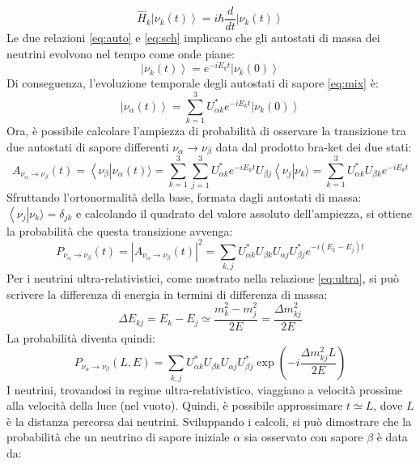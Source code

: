 \begin{equation}
    \hat{H}_k\left|\nu_k(t)\right\rangle=i\hbar\frac{d}{dt}\left|\nu_k(t)\right\rangle
    \label{eq:sch}
\end{equation}
Le due relazioni \ref{eq:auto} e \ref{eq:sch} implicano che gli autostati di massa dei neutrini evolvono nel tempo come onde piane:
\begin{equation}
    \left|\nu_k(t)\right\rangle=e^{-iE_kt}\left|\nu_k(0)\right\rangle
\end{equation}
Di conseguenza, l'evoluzione temporale  degli autostati di sapore \ref{eq:mix} è:
\begin{equation}
     \left|\nu_\alpha(t)\right\rangle=\sum_{k=1}^3U^*_{\alpha k}e^{-iE_kt}\left|\nu_k(0)\right\rangle
\end{equation}
Ora, è possibile calcolare l'ampiezza di probabilità di osservare la transizione tra due autostati di sapore differenti $\nu_\alpha\to\nu_\beta$ data dal prodotto bra-ket dei due stati:
\begin{equation}
    A_{\nu_\alpha\to\nu_\beta}(t)=\left\langle\nu_\beta\right|\nu_\alpha(t)\rangle=\sum_{k=1}^{3}\sum_{j=1}^3U_{\alpha k}^*e^{-iE_kt}U_{\beta j}\left\langle\nu_j\right|\nu_k\rangle=\sum_{k=1}^3U_{\alpha k}^*U_{\beta k}e^{-iE_kt}
\end{equation}
Sfruttando l'ortonormalità della base, formata dagli autostati di massa: $\left\langle\nu_j\right|\nu_k\rangle=\delta_{jk}$ e calcolando il quadrato del valore assoluto dell'ampiezza, si ottiene la probabilità che questa transizione avvenga:
\begin{equation}
    P_{\nu_\alpha\to\nu_\beta}(t)=\left|A_{\nu_\alpha\to\nu_\beta}(t)\right|^2=\sum_{k,j}U_{\alpha k}^*U_{\beta k}U_{\alpha j}U_{\beta j}^*e^{-i(E_k-E_j)t}
\end{equation}
Per i neutrini ultra-relativistici, come mostrato nella relazione \ref{eq:ultra}, si può scrivere la differenza di energia in termini di differenza di massa:
\begin{equation}
    \Delta E_{kj}=E_k-E_j\simeq\frac{m^2_k-m^2_j}{2E}=\frac{\Delta m^2_{kj}}{2E}
\end{equation}
La probabilità diventa quindi:
\begin{equation}
     P_{\nu_\alpha\to\nu_\beta}(L, E)=\sum_{k,j}U_{\alpha k}^*U_{\beta k}U_{\alpha j}U_{\beta j}^*\exp{\left(-i\frac{\Delta m_{kj}^2L}{2E}\right)}
\end{equation}
I neutrini, trovandosi in regime ultra-relativistico, viaggiano a velocità prossime alla velocità della luce (nel vuoto). Quindi, è possibile approssimare $t\simeq L$, dove $L$ è la distanza percorsa dai neutrini. Sviluppando i calcoli, si può dimostrare che la probabilità che un neutrino di sapore iniziale $\alpha$ sia osservato con sapore $\beta$ è data da:
